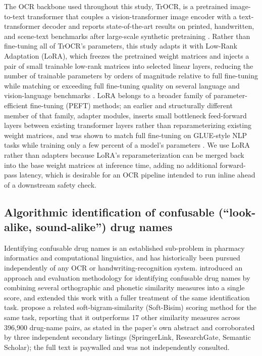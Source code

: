 \documentclass[fleqn,10pt]{wlpeerj}
\begin{document}
The OCR backbone used throughout this study, TrOCR, is a pretrained image-to-text transformer that couples a vision-transformer image encoder with a text-transformer decoder and reports state-of-the-art results on printed, handwritten, and scene-text benchmarks after large-scale synthetic pretraining \citep{li2023trocr}. Rather than fine-tuning all of TrOCR's parameters, this study adapts it with Low-Rank Adaptation (LoRA), which freezes the pretrained weight matrices and injects a pair of small trainable low-rank matrices into selected linear layers, reducing the number of trainable parameters by orders of magnitude relative to full fine-tuning while matching or exceeding full fine-tuning quality on several language and vision-language benchmarks \citep{hu2022lora}. LoRA belongs to a broader family of parameter-efficient fine-tuning (PEFT) methods; an earlier and structurally different member of that family, adapter modules, inserts small bottleneck feed-forward layers between existing transformer layers rather than reparameterizing existing weight matrices, and was shown to match full fine-tuning on GLUE-style NLP tasks while training only a few percent of a model's parameters \citep{houlsby2019parameter}. We use LoRA rather than adapters because LoRA's reparameterization can be merged back into the base weight matrices at inference time, adding no additional forward-pass latency, which is desirable for an OCR pipeline intended to run inline ahead of a downstream safety check.

\subsection*{Algorithmic identification of confusable (``look-alike, sound-alike'') drug names}\label{sec:related-lasa}

Identifying confusable drug names is an established sub-problem in pharmacy informatics and computational linguistics, and has historically been pursued independently of any OCR or handwriting-recognition system. \citet{kondrak2004identification} introduced an approach and evaluation methodology for identifying confusable drug names by combining several orthographic and phonetic similarity measures into a single score, and \citet{kondrak2006automatic} extended this work with a fuller treatment of the same identification task. \citet{millanhernandez2019soft} propose a related soft-bigram-similarity (Soft-Bisim) scoring method for the same task, reporting that it outperforms 17 other similarity measures across 396,900 drug-name pairs, as stated in the paper's own abstract and corroborated by three independent secondary listings (SpringerLink, ResearchGate, Semantic Scholar); the full text is paywalled and was not independently consulted.
\end{document}

